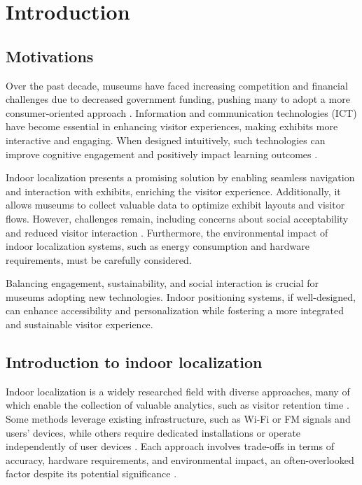 \chapter{Introduction}
\label{chap:introduction}

\section{Motivations}



Over the past decade, museums have faced increasing competition and financial challenges due to decreased government funding, pushing many to adopt a more consumer-oriented approach \cite{chiappa_emotions_2014}. Information and communication technologies (ICT) have become essential in enhancing visitor experiences, making exhibits more interactive and engaging. When designed intuitively, such technologies can improve cognitive engagement and positively impact learning outcomes \cite{pallud_impact_2017}.   

Indoor localization presents a promising solution by enabling seamless navigation and interaction with exhibits, enriching the visitor experience. Additionally, it allows museums to collect valuable data to optimize exhibit layouts and visitor flows. However, challenges remain, including concerns about social acceptability and reduced visitor interaction \cite{tom_dieck_enhancing_2018}. Furthermore, the environmental impact of indoor localization systems, such as energy consumption and hardware requirements, must be carefully considered.   

Balancing engagement, sustainability, and social interaction is crucial for museums adopting new technologies. Indoor positioning systems, if well-designed, can enhance accessibility and personalization while fostering a more integrated and sustainable visitor experience.  

\section{Introduction to indoor localization}


Indoor localization is a widely researched field with diverse approaches, many of which enable the collection of valuable analytics, such as visitor retention time \cite{spachos_ble_2020}. Some methods leverage existing infrastructure, such as Wi-Fi or FM signals and users' devices, while others require dedicated installations or operate independently of user devices \cite{ali_locali_2017}. Each approach involves trade-offs in terms of accuracy, hardware requirements, and environmental impact, an often-overlooked factor despite its potential significance \cite{mainetti_survey_2014}.   

